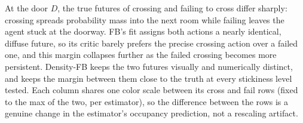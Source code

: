 At the door $D$, the true futures of crossing and failing to cross differ sharply: crossing spreads probability mass into the next room while failing leaves the agent stuck at the doorway. FB's fit assigns both actions a nearly identical, diffuse future, so its critic barely prefers the precise crossing action over a failed one, and this margin collapses further as the failed crossing becomes more persistent. Density-FB keeps the two futures visually and numerically distinct, and keeps the margin between them close to the truth at every stickiness level tested. Each column shares one color scale between its cross and fail rows (fixed to the max of the two, per estimator), so the difference between the rows is a genuine change in the estimator's occupancy prediction, not a rescaling artifact.
